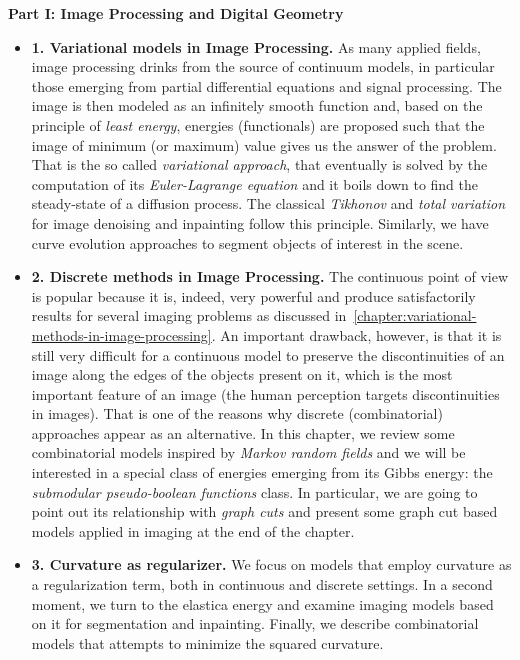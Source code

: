 \textbf{Part I: Image Processing and Digital Geometry}
\begin{itemize}
\item[]{\textbf{1. Variational models in Image Processing.} As many applied fields, image processing drinks from the source of continuum models, in particular those emerging from partial differential equations and signal processing.  The image is then modeled as an infinitely smooth function and, based on the principle of \emph{least energy}, energies (functionals) are proposed such that the image of minimum (or maximum) value gives us the answer of the problem. That is the so called \emph{variational approach}, that eventually is solved by the computation of its \emph{Euler-Lagrange equation} and it boils down to find the steady-state of a diffusion process. The classical \emph{Tikhonov} and \emph{total variation} for image denoising and inpainting follow this principle. Similarly, we have curve evolution approaches to segment  objects of interest in the scene.}
\item[]{\textbf{2. Discrete methods in Image Processing.} The continuous point of view is popular because it is, indeed, very powerful and produce satisfactorily results for several imaging problems as discussed in~\cref{chapter:variational-methods-in-image-processing}. An important drawback, however, is that it is still very difficult for a continuous model to preserve the discontinuities of an image along the edges of the objects present on it, which is the most important feature of an image (the human perception targets discontinuities in images). That is one of the reasons why discrete (combinatorial) approaches appear as an alternative. In this chapter, we review some combinatorial models inspired by \emph{Markov random fields} and we will be interested in a special class of energies emerging from its Gibbs energy: the \emph{submodular pseudo-boolean functions} class. In particular, we are going to point out its relationship with \emph{graph cuts} and present some graph cut based models applied in imaging at the end of the chapter.}
\item[]{\textbf{3. Curvature as regularizer.} We focus on models that employ curvature as a regularization term, both in continuous and discrete settings. In a second moment, we turn to the elastica energy and examine imaging models based on it for segmentation and inpainting. Finally, we describe combinatorial models that attempts to minimize the squared curvature.}

\end{itemize}

